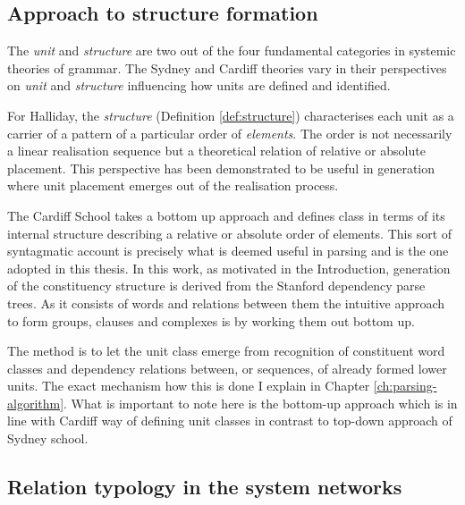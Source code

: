 \subsection{Approach to structure formation}
The \textit{unit} and \textit{structure} are two out of the four fundamental categories in systemic theories of grammar. The Sydney and Cardiff theories vary in their perspectives on \textit{unit} and \textit{structure} influencing how units are defined and identified.

For Halliday, the \textit{structure} (Definition \ref{def:structure}) characterises each unit as a carrier of a pattern of a particular order of \textit{elements}. The order is not necessarily a linear realisation sequence but a theoretical relation of relative or absolute placement. This perspective has been demonstrated to be useful in generation where unit placement emerges out of the realisation process.

The Cardiff School takes a bottom up approach and defines class in terms of its internal structure describing a relative or absolute order of elements. This sort of syntagmatic account is precisely what is deemed useful in parsing and is the one adopted in this thesis. 
In this work, as motivated in the Introduction, generation of the constituency structure is derived from the Stanford dependency parse trees. As it consists of words and relations between them the intuitive approach to form groups, clauses and complexes is by working them out bottom up. 

The method is to let the unit class emerge from recognition of constituent word classes and dependency relations between, or sequences, of already formed lower units. The exact mechanism how this is done I explain in Chapter \ref{ch:parsing-algorithm}. What is important to note here is the bottom-up approach which is in line with Cardiff way of defining unit classes in contrast to top-down approach of Sydney school.


\subsection{Relation typology in the system networks}

